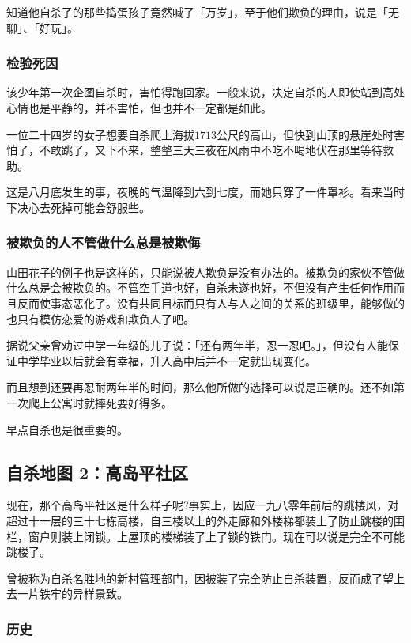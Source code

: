 \documentclass[UTF8]{ctexart}
\begin{document}
知道他自杀了的那些捣蛋孩子竟然喊了「万岁」，至于他们欺负的理由，说是「无聊」、「好玩」。

\subsubsection*{检验死因}

该少年第一次企图自杀时，害怕得跑回家。一般来说，决定自杀的人即使站到高处心情也是平静的，并不害怕，但也并不一定都是如此。

一位二十四岁的女子想要自杀爬上海拔$1713$公尺的高山，但快到山顶的悬崖处时害怕了，不敢跳了，又下不来，整整三天三夜在风雨中不吃不喝地伏在那里等待救助。

这是八月底发生的事，夜晚的气温降到六到七度，而她只穿了一件罩衫。看来当时下决心去死掉可能会舒服些。

\subsubsection*{被欺负的人不管做什么总是被欺侮}

山田花子的例子也是这样的，只能说被人欺负是没有办法的。被欺负的家伙不管做什么总是会被欺负的。不管空手道也好，自杀未遂也好，不但没有产生任何作用而且反而使事态恶化了。没有共同目标而只有人与人之间的关系的班级里，能够做的也只有模仿恋爱的游戏和欺负人了吧。

据说父亲曾劝过中学一年级的儿子说：「还有两年半，忍一忍吧。」，但没有人能保证中学毕业以后就会有幸福，升入高中后并不一定就出现变化。

而且想到还要再忍耐两年半的时间，那么他所做的选择可以说是正确的。还不如第一次爬上公寓时就摔死要好得多。

早点自杀也是很重要的。

\subsection{自杀地图 2：高岛平社区}

现在，那个高岛平社区是什么样子呢?事实上，因应一九八零年前后的跳楼风，对超过十一层的三十七栋高楼，自三楼以上的外走廊和外楼梯都装上了防止跳楼的围栏，窗户则装上闭锁。上屋顶的楼梯装了上了锁的铁门。现在可以说是完全不可能跳楼了。

曾被称为自杀名胜地的新村管理部门，因被装了完全防止自杀装置，反而成了望上去一片铁牢的异样景致。

\subsubsection*{历史}
\end{document}
